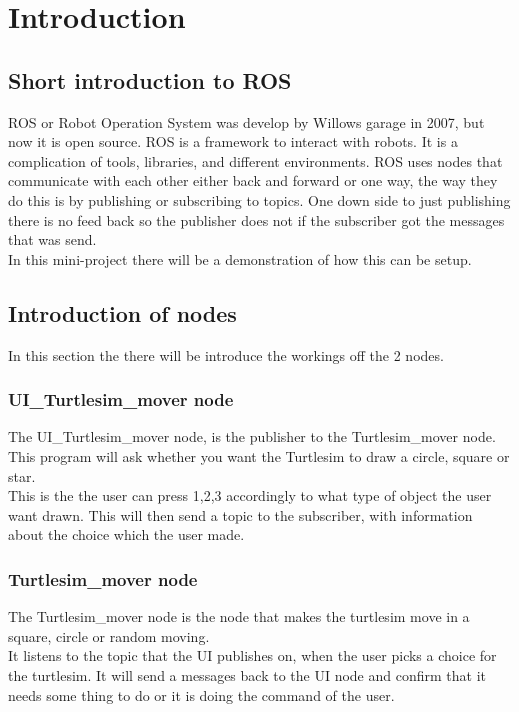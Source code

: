 \chapter{Introduction}

\section{Short introduction to ROS}
ROS or Robot Operation System was develop by Willows garage in 2007, but now it is open source. ROS is a framework to interact with robots. It is a complication of tools, libraries, and different environments\cite{ROSINTRO}. ROS uses nodes that communicate with each other either back and forward or one way, the way they do this is by publishing or subscribing to topics. One down side to just publishing there is no feed back so the publisher does not if the subscriber got the messages that was send.\\
In this mini-project there will be a demonstration of how this can be setup.
\section{Introduction of nodes}\label{ch:introduction}

In this section the there will be introduce the workings off the 2 nodes.

\subsection{UI\_Turtlesim\_mover node}

The UI\_Turtlesim\_mover node, is the publisher to the Turtlesim\_mover node.\\
This program will ask whether you want the Turtlesim to draw a circle, square or star.\\
This is the  the user can press 1,2,3 accordingly to what type of object the user want drawn. This will then send a topic to the subscriber, with information about the choice which the user made.\\


\subsection{Turtlesim\_mover node}


The Turtlesim\_mover node is the node that makes the turtlesim move in a square, circle or random moving.\\
It listens to the topic that the UI publishes on, when the user picks a choice for the turtlesim.
It will send a messages back to the UI node and confirm that it needs some thing to do or it is doing the command of the user.\\